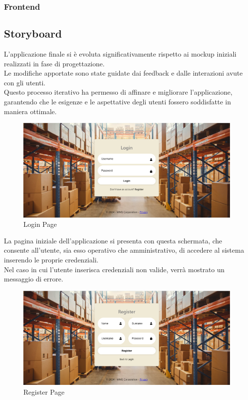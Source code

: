 \subsubsection{Frontend}

\subsection{Storyboard}

L'applicazione finale si è evoluta significativamente rispetto ai mockup iniziali realizzati in fase di progettazione.\\
Le modifiche apportate sono state guidate dai feedback e dalle interazioni avute con gli utenti.\\
Questo processo iterativo ha permesso di affinare e migliorare l'applicazione, garantendo che le esigenze e le
aspettative degli utenti fossero soddisfatte in maniera ottimale.

\begin{figure}[H]
    \centering
    \includegraphics[width=\textwidth]{document/sections/img/Storyboard/login.png}
    \caption{Login Page}
    \label{fig:loginPage}
\end{figure}

La pagina iniziale dell’applicazione si presenta con questa schermata, che consente all’utente, sia esso operativo che
amministrativo, di accedere al sistema inserendo le proprie credenziali.\\
Nel caso in cui l’utente inserisca credenziali non valide, verrà mostrato un messaggio di errore.

\begin{figure}[H]
    \centering
    \includegraphics[width=\textwidth]{document/sections/img/Storyboard/register.png}
    \caption{Register Page}
    \label{fig:registerPage}
\end{figure}

